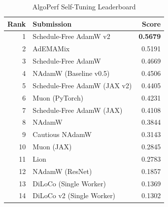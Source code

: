\begin{table}[h]
  \centering
  \caption{AlgoPerf Self-Tuning Leaderboard}
  \label{tab:scores}
  \begin{tabular}{rlr}
    \toprule
    Rank & Submission & Score \\
    \midrule
    1 & Schedule-Free AdamW v2 & \textbf{0.5679} \\
    2 & AdEMAMix & 0.5191 \\
    3 & Schedule-Free AdamW & 0.4669 \\
    4 & NAdamW (Baseline v0.5) & 0.4506 \\
    5 & Schedule-Free AdamW (JAX v2) & 0.4405 \\
    6 & Muon (PyTorch) & 0.4231 \\
    7 & Schedule-Free AdamW (JAX) & 0.4108 \\
    8 & NAdamW & 0.3844 \\
    9 & Cautious NAdamW & 0.3143 \\
    10 & Muon (JAX) & 0.2845 \\
    11 & Lion & 0.2783 \\
    12 & NAdamW (ResNet) & 0.1857 \\
    13 & DiLoCo (Single Worker) & 0.1369 \\
    14 & DiLoCo v2 (Single Worker) & 0.1302 \\
    \bottomrule
  \end{tabular}
\end{table}